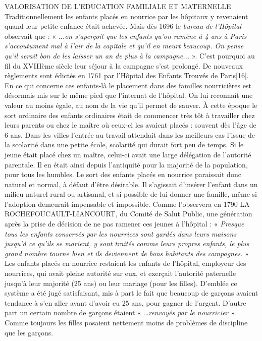 VALORISATION DE L'EDUCATION FAMILIALE ET MATERNELLE
 Traditionnellement les enfants placés en nourrice par les hôpitaux y revenaient quand leur petite enfance était achevée. Mais dès 1696 le \emph{bureau de l'Hôpital} observait que : « .\emph{..on s'aperçoit que les enfants qu'on ramène à 4 ans à Paris s'accoutument mal à l'air de la capitale et qu'il en meurt beaucoup. On pense qu'il serait bon de les laisser un an de plus à la campagne...} ». C'est pourquoi au fil du XVIIIème siècle leur séjour à la campagne s'est prolongé.
 De nouveaux règlements sont édictés en 1761 par l'Hôpital des Enfants Trouvés de Paris[16]. En ce qui concerne ces enfants-là le placement dans des familles nourricières est désormais mis sur le même pied que l'internat de l'hôpital. On lui reconnaît une valeur au moins égale, au nom de la vie qu'il permet de sauver. 
 À cette époque le sort ordinaire des enfants ordinaires était de commencer très tôt à travailler chez leurs parents ou chez le maître où ceux-ci les avaient placés : souvent dès l'âge de 6 ans. Dans les villes l'entrée au travail attendait dans les meilleurs cas l'issue de la scolarité dans une petite école, scolarité qui durait fort peu de temps. Si le jeune était placé chez un maître, celui-ci avait une large délégation de l'autorité parentale. Il en était ainsi depuis l'antiquité pour la majorité de la population, pour tous les humbles. Le sort des enfants placés en nourrice paraissait donc naturel et normal, à défaut d'être désirable.
 Il s'agissait d'insérer l'enfant dans un milieu naturel rural ou artisanal, et si possible de lui donner une famille, même si l'adoption demeurait impensable et impossible. Comme l'observera en 1790 LA ROCHEFOUCAULT-LIANCOURT, du Comité de Salut Public, une génération après la prise de décision de ne pas ramener ces jeunes à l'hôpital : « \emph{Presque tous les enfants conservés par les nourrices sont gardés dans leurs maisons jusqu'à ce qu'ils se marient, y sont traités comme leurs propres enfants, le plus grand nombre tourne bien et ils deviennent de bons habitants des campagnes.} » Les enfants placés en nourrice restaient les enfants de l'hôpital, employeur des nourrices, qui avait pleine autorité sur eux, et exerçait l'autorité paternelle jusqu'à leur majorité (25 ans) ou leur mariage (pour les filles). 
 D'emblée ce système a été jugé satisfaisant, mis à part le fait que beaucoup de garçons avaient tendance à s'en aller avant d'avoir eu 25 ans, pour gagner de l'argent. D'autre part un certain nombre de garçons étaient « \emph{…renvoyés par le nourricier} ». Comme toujours les filles posaient nettement moins de problèmes de discipline que les garçons. 
